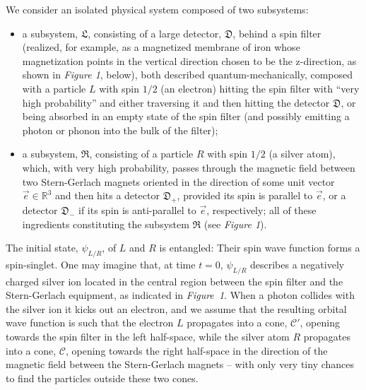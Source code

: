 \documentclass[12pt]{article}
\begin{document}
We consider an isolated physical system composed of two subsystems: 
\begin{itemize}
\item{a subsystem, $\mathfrak{L}$, consisting of a large detector, $\mathfrak{D}$, behind a spin filter (realized, for example, 
as a magnetized membrane of iron whose magnetization points in the vertical direction 
chosen to be the z-direction, as shown in \textit{Figure 1}, below), both described quantum-mechanically, composed with a 
particle $L$ with spin $1/2$ (an electron) hitting the spin filter with ``very high probability'' and either traversing 
it and then hitting the detector $\mathfrak{D}$, or being absorbed in an empty state of the spin filter 
(and possibly emitting a photon or phonon into the bulk of the filter);}
\item{a subsystem, $\mathfrak{R}$, consisting of a particle $R$ with spin $1/2$ (a silver atom),
which, with very high probability, passes through the magnetic field between two Stern-Gerlach magnets oriented 
in the direction of some unit vector $\vec{e} \in \mathbb{R}^{3}$ and then hits a detector $\mathfrak{D}_{+}$, provided
 its spin is parallel to $\vec{e}$, or a detector $\mathfrak{D}_{-}$ if its spin is anti-parallel to $\vec{e}$, 
 respectively; all of these ingredients constituting the subsystem $\mathfrak{R}$ (see \textit{Figure 1}).}
\end{itemize}
The initial state, $\psi_{L/R}$, of $L$ and $R$ is entangled: Their spin wave function forms 
a spin-singlet. One may imagine that, at time $t=0$, $\psi_{L/R}$ describes a negatively charged silver ion 
located in the central region between the spin filter and the Stern-Gerlach equipment, as indicated in \mbox{\textit{Figure 1}.} 
When a photon collides with the silver ion it kicks out an electron, and we assume that the resulting orbital wave function 
is such that the electron $L$ propagates into a cone, $\mathcal{C}'$, opening towards the spin filter in the left half-space, 
while the silver atom $R$ propagates into a cone, $\mathcal{C}$, opening towards the right half-space in the direction of the 
magnetic field between the Stern-Gerlach magnets -- with only very tiny chances to find the particles outside these 
two cones. 
\end{document}
